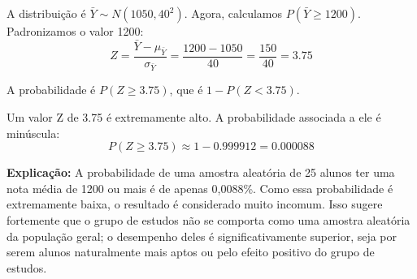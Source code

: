 \documentclass[12pt, a4paper]{article}
\begin{document}
\begin{itemize}
    A distribuição é $\bar{Y} \sim N(1050, 40^2)$. Agora, calculamos $P(\bar{Y} \ge 1200)$. Padronizamos o valor 1200:
    $$ Z = \frac{\bar{Y} - \mu_{\bar{Y}}}{\sigma_{\bar{Y}}} = \frac{1200 - 1050}{40} = \frac{150}{40} = 3.75 $$
    
    A probabilidade é $P(Z \ge 3.75)$, que é $1 - P(Z < 3.75)$.
    
    Um valor Z de 3.75 é extremamente alto. A probabilidade associada a ele é minúscula:
    $$ P(Z \ge 3.75) \approx 1 - 0.999912 = 0.000088 $$
    
    \textbf{Explicação:} A probabilidade de uma amostra aleatória de 25 alunos ter uma nota média de 1200 ou mais é de apenas 0,0088\%. Como essa probabilidade é extremamente baixa, o resultado é considerado muito incomum. Isso sugere fortemente que o grupo de estudos não se comporta como uma amostra aleatória da população geral; o desempenho deles é significativamente superior, seja por serem alunos naturalmente mais aptos ou pelo efeito positivo do grupo de estudos.
    
\end{itemize}
\end{document}
